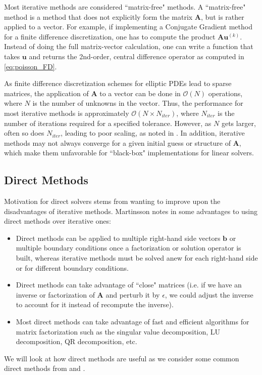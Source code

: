 Most iterative methods are considered ``matrix-free" methods. A ``matrix-free" method is a method that does not explicitly form the matrix $\textbf{A}$, but is rather applied to a vector. For example, if implementing a Conjugate Gradient method for a finite difference discretization, one has to compute the product $\textbf{A} \textbf{u}^{(k)}$. Instead of doing the full matrix-vector calculation, one can write a function that takes $\textbf{u}$ and returns the 2nd-order, central difference operator as computed in \ref{eq:poisson_FD}.

As finite difference discretization schemes for elliptic PDEs lead to sparse matrices, the application of $\textbf{A}$ to a vector can be done in $\mathcal{O}(N)$ operations, where $N$ is the number of unknowns in the vector. Thus, the performance for most iterative methods is approximately $\mathcal{O}(N \times N_{iter})$, where $N_{iter}$ is the number of iterations required for a specified tolerance. However, as $N$ gets larger, often so does $N_{iter}$, leading to poor scaling, as noted in \cite{martinsson2019fast}. In addition, iterative methods may not always converge for a given initial guess or structure of $\textbf{A}$, which make them unfavorable for ``black-box" implementations for linear solvers.

\subsection{Direct Methods}
\label{sub:direct-methods}

Motivation for direct solvers stems from wanting to improve upon the disadvantages of iterative methods. Martinsson notes in \cite{martinsson2004fast} some advantages to using direct methods over iterative ones:
\begin{itemize}
    \item Direct methods can be applied to multiple right-hand side vectors $\textbf{b}$ or multiple boundary conditions once a factorization or solution operator is built, whereas iterative methods must be solved anew for each right-hand side or for different boundary conditions.

    \item Direct methods can take advantage of ``close" matrices (i.e. if we have an inverse or factorization of $\textbf{A}$ and perturb it by $\epsilon$, we could adjust the inverse to account for it instead of recompute the inverse).

    \item Most direct methods can take advantage of fast and efficient algorithms for matrix factorization such as the singular value decomposition, LU decomposition, QR decomposition, etc.
\end{itemize}
We will look at how direct methods are useful as we consider some common direct methods from \cite{leveque2007finite} and \cite{trefethen1997numerical}.

